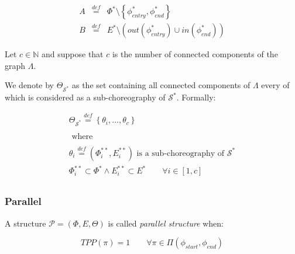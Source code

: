 \documentclass[12pt,a4paper]{report}
\newcommand*{\N}{\mathbb{N}}
\newcommand{\mathDef}{\overset{\textit{def}}{=}}
\theoremstyle{definition}
\begin{document}
\begin{equation}
	\begin{array}{lll}
		A & \mathDef & \Phi^* \setminus \left\lbrace \phi_{entry}^*,\phi_{end}^* \right\rbrace   \\
		B & \mathDef & E^* \setminus \left( out\left(\phi_{entry}^*\right) \cup in\left(\phi_{end}^*\right) \right)
	\end{array}
\end{equation}

Let $c \in \N$ and suppose that $c$ is the number of connected components of the graph $\Lambda$.

We denote by $\Theta_{\mathcal{S}^*}$ as the set containing all connected components of $\Lambda$ every of which is considered as a sub-choreography of $\mathcal{S}^*$. Formally:

\begin{equation}
	\begin{array}{c}
		\Theta_{\mathcal{S}^*} \mathDef \left\lbrace \theta_i, \ldots ,\theta_c \right\rbrace \\\\
		\text{ where } \\\\
		
		\theta_i \mathDef (\Phi^{**}_i, E^{**}_i) \text{ is a sub-choreography of } \mathcal{S}^* \\
		\Phi^{**}_i \subset \Phi^{*} \wedge E^{**}_i \subset E^{*} \qquad \forall i \in \left[ 1, c \right] \\
	\end{array}
\end{equation} 

\subsubsection{Parallel}

A structure $\mathcal{P} = (\Phi,E,\Theta)$ is called \textit{parallel structure} when:

\begin{equation}
	TPP(\pi) = 1 \qquad \forall \pi \in \Pi(\phi_{start}, \phi_{end})
\end{equation}
\end{document}
